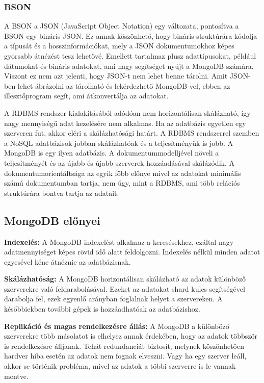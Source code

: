 \subsubsection{BSON}
A BSON \cite{14} a JSON (JavaScript Object Notation) egy változata, pontosítva a BSON egy bináris JSON. Ez annak köszönhető, hogy bináris struktúrára kódolja a típusát és a hosszinformációkat, mely a JSON dokumentumokhoz képes gyorsabb átnézést tesz lehetővé. Emellett tartalmaz plusz adattípusokat, például dátumokat és bináris adatokat, ami nagy segítséget nyújt a MongoDB számára. Viszont ez nem azt jelenti, hogy JSON-t nem lehet benne tárolni. Amit JSON-ben lehet ábrázolni az tárolható és lekérdezhető MongoDB-vel, ebben az illesztőprogram segít, ami átkonvertálja az adatokat.

A RDBMS rendszer kialakításából adódóan nem horizontálisan skálázható, így nagy mennyiségű adat kezelésére nem alkalmas. Ha az adatbázis egyetlen egy szerveren fut, akkor eléri a skálázhatósági határt. A RDBMS rendszerrel szemben a NoSQL adatbázisok jobban skálázhatóak és a teljesítményük is jobb. A MongoDB is egy ilyen adatbázis. A dokumentummodelljével növeli a teljesítményét és az újabb és újabb szerverek hozzáadásával skálázódik. A dokumentumorientáltsága az egyik főbb előnye mivel az adatokat minimális számú dokumentumban tartja, nem úgy, mint a RDBMS, ami több relációs struktúrára bontva tartja az adatait.

\subsection{MongoDB előnyei}
\textbf{Indexelés:} A MongoDB indexelést alkalmaz a keresésekhez, ezáltal nagy adatmennyiséget képes rövid idő alatt feldolgozni. Indexelés nélkül minden adatot egyesével kéne átnéznie az adatbázisnak.

\textbf{Skálázhatóság:} A MongoDB horizontálisan skálázható az adatok különböző szerverekre való feldarabolásával. Ezeket az adatokat shard kulcs segítségével darabolja fel, ezek egyenlő arányban foglalnak helyet a szervereken. A későbbiekben további gépek is hozzáadhatóak az adatbázishoz.

\textbf{Replikáció és magas rendelkezésre állás:} A MongoDB a különböző szerverekre több másolatot is elhelyez annak érdekében, hogy az adatok többször is rendelkezésre álljanak. Tehát redundanciát biztosít, melynek köszönhetően hardver hiba esetén az adatok nem fognak elveszni. Vagy ha egy szerver leáll, akkor se történik probléma, mivel az adatok a többi szerverre is le vannak mentve.

